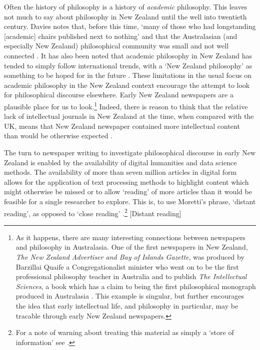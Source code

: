 \documentclass{article}
\begin{document}
Often the history of philosophy is a history of \textit{academic} philosophy. This leaves not much to say about philosophy in New Zealand until the well into twentieth century. Davies notes that, before this time, ‘many of those who had longstanding [academic] chairs published next to nothing’ and that the Australasian (and especially New Zealand) philosophical community was small and not well connected \cite[24]{davies-2014}. It has also been noted that academic philosophy in New Zealand has tended to simply follow international trends, with a `New Zealand philosophy' as something to be hoped for in the future \cite[ix--x]{oddie-1992}. These limitations in the usual focus on academic philosophy in the New Zealand context encourage the attempt to look for philosophical discourse elsewhere. Early New Zealand newspapers are a plausible place for us to look.\footnote{
As it happens, there are many interesting connections between newspapers and philosophy in Australasia. One of the first newspapers in New Zealand, \textit{The New Zealand Advertiser and Bay of Islands Gazette}, was produced by Barzillai Quaife a Congregationalist minister who went on to be the first professional philosophy teacher in Australia and to publish \textit{The Intellectual Sciences}, a book which has a claim to being the first philosophical monograph produced in Australasia \cite[16--17]{davies-2014}. This example is singular, but further encourages the idea that early intellectual life, and philosophy in particular, may be tracable through early New Zealand newspapers.}
Indeed, there is reason to think that the relative lack of intellectual journals in New Zealand at the time, when compared with the UK, means that New Zealand newspaper contained more intellectual content than would be otherwise expected \cite[57]{ballantyne-2012} \cite[37]{crane-2013}.

The turn to newspaper writing to investigate philosophical discourse in early New Zealand is enabled by the availability of digital humanities and data science methods. The availability of more than seven million articles in digital form allows for the application of text processing methods to highlight content which might otherwise be missed or to allow `reading' of more articles than it would be feasible for a single researcher to explore. This is, to use Moretti's phrase, `distant reading', as opposed to `close reading' \cite[47--49]{moretti}.\footnote{For a note of warning about treating this material as simply a `store of information' see \cite[59-60]{ballantyne-2012}.} [Distant reading]
\end{document}
